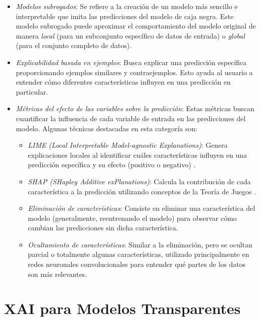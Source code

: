 \begin{itemize}
    \item \textit{Modelos subrogados}: Se refiere a la creación de un modelo más sencillo e interpretable que imita las predicciones del modelo de caja negra. Este modelo subrogado puede aproximar el comportamiento del modelo original de manera \textit{local} (para un subconjunto específico de datos de entrada) o \textit{global} (para el conjunto completo de datos).
    
    \item \textit{Explicabilidad basada en ejemplos}: Busca explicar una predicción específica proporcionando ejemplos similares y contraejemplos. Esto ayuda al usuario a entender cómo diferentes características influyen en una predicción en particular.
    
    \item \textit{Métricas del efecto de las variables sobre la predicción}: Estas métricas buscan cuantificar la influencia de cada variable de entrada en las predicciones del modelo. Algunas técnicas destacadas en esta categoría son:
    \begin{itemize}
        \item \textit{LIME (Local Interpretable Model-agnostic Explanations)}: Genera explicaciones locales al identificar cuáles características influyen en una predicción específica y su efecto (positivo o negativo) \cite{ribeiro2016should}.
        \item \textit{SHAP (SHapley Additive exPlanations)}: Calcula la contribución de cada característica a la predicción utilizando conceptos de la Teoría de Juegos \cite{lundberg2017unified}.
        \item \textit{Eliminación de características}: Consiste en eliminar una característica del modelo (generalmente, reentrenando el modelo) para observar cómo cambian las predicciones sin dicha característica.
        \item \textit{Ocultamiento de características}: Similar a la eliminación, pero se ocultan parcial o totalmente algunas características, utilizado principalmente en redes neuronales convolucionales para entender qué partes de los datos son más relevantes.
    \end{itemize}
\end{itemize}

\section{XAI para Modelos Transparentes}

